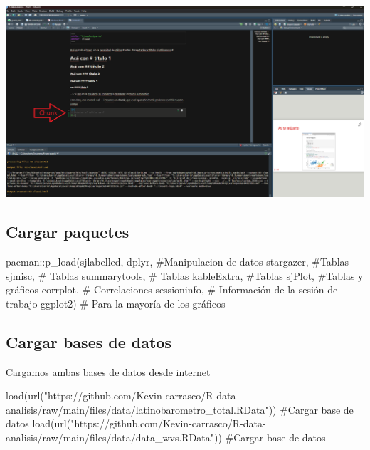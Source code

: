 \documentclass[
  letterpaper,
  DIV=11,
  numbers=noendperiod]{scrartcl}
\newenvironment{Shaded}{\begin{snugshade}}{\end{snugshade}}
\newcommand{\CommentTok}[1]{\textcolor[rgb]{0.37,0.37,0.37}{#1}}
\newcommand{\FunctionTok}[1]{\textcolor[rgb]{0.28,0.35,0.67}{#1}}
\newcommand{\NormalTok}[1]{\textcolor[rgb]{0.00,0.23,0.31}{#1}}
\newcommand{\SpecialCharTok}[1]{\textcolor[rgb]{0.37,0.37,0.37}{#1}}
\newcommand{\StringTok}[1]{\textcolor[rgb]{0.13,0.47,0.30}{#1}}
\begin{document}
\includegraphics{images/quarto3.png}

\subsection{Cargar paquetes}\label{cargar-paquetes}

\begin{Shaded}
\begin{Highlighting}[]
\NormalTok{pacman}\SpecialCharTok{::}\FunctionTok{p\_load}\NormalTok{(sjlabelled,}
\NormalTok{               dplyr, }\CommentTok{\#Manipulacion de datos}
\NormalTok{              stargazer, }\CommentTok{\#Tablas}
\NormalTok{              sjmisc, }\CommentTok{\# Tablas}
\NormalTok{              summarytools, }\CommentTok{\# Tablas}
\NormalTok{              kableExtra, }\CommentTok{\#Tablas}
\NormalTok{              sjPlot, }\CommentTok{\#Tablas y gráficos}
\NormalTok{              corrplot, }\CommentTok{\# Correlaciones}
\NormalTok{              sessioninfo, }\CommentTok{\# Información de la sesión de trabajo}
\NormalTok{              ggplot2) }\CommentTok{\# Para la mayoría de los gráficos}
\end{Highlighting}
\end{Shaded}

\subsection{Cargar bases de datos}\label{cargar-bases-de-datos}

Cargamos ambas bases de datos desde internet

\begin{Shaded}
\begin{Highlighting}[]
\FunctionTok{load}\NormalTok{(}\FunctionTok{url}\NormalTok{(}\StringTok{"https://github.com/Kevin{-}carrasco/R{-}data{-}analisis/raw/main/files/data/latinobarometro\_total.RData"}\NormalTok{)) }\CommentTok{\#Cargar base de datos}
\FunctionTok{load}\NormalTok{(}\FunctionTok{url}\NormalTok{(}\StringTok{"https://github.com/Kevin{-}carrasco/R{-}data{-}analisis/raw/main/files/data/data\_wvs.RData"}\NormalTok{)) }\CommentTok{\#Cargar base de datos}
\end{Highlighting}
\end{Shaded}
\end{document}
